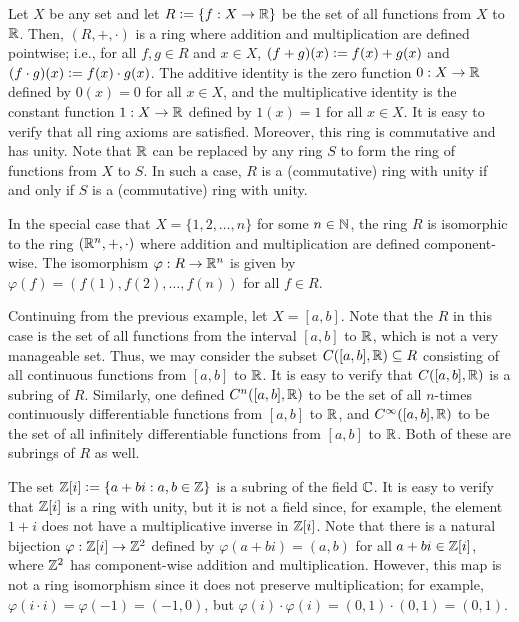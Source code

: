 \begin{example}
    Let $X$ be any set and let $R \vcentcolon= \{f:X \to \mathbb{R}\}$ be the set of all functions from $X$ to $\mathbb{R}$. Then, $(R, +, \cdot)$ is a ring where addition and multiplication are defined pointwise; i.e., for all $f, g \in R$ and $x \in X$, $(f + g)(x) \vcentcolon= f(x) + g(x)$ and $(f \cdot g)(x) \vcentcolon= f(x) \cdot g(x)$. The additive identity is the zero function $0:X \to \mathbb{R}$ defined by $0(x) = 0$ for all $x \in X$, and the multiplicative identity is the constant function $1:X \to \mathbb{R}$ defined by $1(x) = 1$ for all $x \in X$. It is easy to verify that all ring axioms are satisfied. Moreover, this ring is commutative and has unity. Note that $\mathbb{R}$ can be replaced by any ring $S$ to form the ring of functions from $X$ to $S$. In such a case, $R$ is a (commutative) ring with unity if and only if $S$ is a (commutative) ring with unity.

    In the special case that $X = \{1,2,\ldots,n\}$ for some $n \in \mathbb{N}$, the ring $R$ is isomorphic to the ring $(\mathbb{R}^{n},+,\cdot)$ where addition and multiplication are defined component-wise. The isomorphism $\varphi : R \to \mathbb{R}^{n}$ is given by $\varphi(f) = (f(1), f(2), \ldots, f(n))$ for all $f \in R$.
\end{example}

\begin{example}
    Continuing from the previous example, let $X = [a,b]$. Note that the $R$ in this case is the set of all functions from the interval $[a,b]$ to $\mathbb{R}$, which is not a very manageable set. Thus, we may consider the subset $C([a,b], \mathbb{R}) \subseteq R$ consisting of all continuous functions from $[a,b]$ to $\mathbb{R}$. It is easy to verify that $C([a,b], \mathbb{R})$ is a subring of $R$. Similarly, one defined $C^{n}([a,b], \mathbb{R})$ to be the set of all $n$-times continuously differentiable functions from $[a,b]$ to $\mathbb{R}$, and $C^{\infty}([a,b], \mathbb{R})$ to be the set of all infinitely differentiable functions from $[a,b]$ to $\mathbb{R}$. Both of these are subrings of $R$ as well.
\end{example}

\begin{example}
    The set $\mathbb{Z}[i] \vcentcolon= \{a + bi : a, b \in \mathbb{Z}\}$ is a subring of the field $\mathbb{C}$. It is easy to verify that $\mathbb{Z}[i]$ is a ring with unity, but it is not a field since, for example, the element $1 + i$ does not have a multiplicative inverse in $\mathbb{Z}[i]$. Note that there is a natural bijection $\varphi : \mathbb{Z}[i] \to \mathbb{Z}^{2}$ defined by $\varphi(a + bi) = (a, b)$ for all $a + bi \in \mathbb{Z}[i]$, where $\mathbb{Z}^{2}$ has component-wise addition and multiplication. However, this map is not a ring isomorphism since it does not preserve multiplication; for example, $\varphi(i \cdot i) = \varphi(-1) = (-1, 0)$, but $\varphi(i) \cdot \varphi(i) = (0, 1) \cdot (0, 1) = (0, 1)$.
\end{example}


